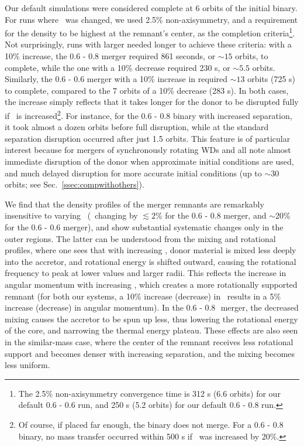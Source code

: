 Our default simulations were considered complete at 6 orbits of the initial binary.  For runs where \azero\ was changed, we used 2.5\% non-axisymmetry, and a requirement for the density to be highest at the remnant's center, as the completion criteria\footnote{The 2.5\% non-axisymmetry convergence time is 312 s (6.6 orbits) for our default 0.6 - 0.6 {\Msun} run, and 250 s (5.2 orbits) for our default 0.6 - 0.8 {\Msun} run.}.  Not surprisingly, runs with larger {\azero} needed longer to achieve these criteria: with a 10\% increase, the 0.6 - 0.8 {\Msun} merger required 861 seconds, or $\sim\!15$ orbits, to complete, while the one with a 10\% decrease required 230 s, or $\sim\!5.5$ orbits.  Similarly, the 0.6 - 0.6 {\Msun} merger with a 10\% increase in {\azero} required $\sim\!13$ orbits (725 s) to complete, compared to the 7 orbits of a 10\% decrease (283 s).  In both cases, the increase simply reflects that it takes longer for the donor to be disrupted fully if \azero\ is increased\footnote{Of course, if placed far enough, the binary does not merge.  For a 0.6 - 0.8 {\Msun} binary, no mass transfer occurred within 500 s if \azero\ was increased by 20\%.}.  For instance, for the 0.6 - 0.8 {\Msun} binary with increased separation, it took almost a dozen orbits before full disruption, while at the standard separation disruption occurred after just 1.5 orbits.  This feature is of particular interest because for mergers of synchronously rotating WDs \cite{dan+11,dan+12} and \cite{rask+12} all note almost immediate disruption of the donor when approximate initial conditions are used, and much delayed disruption for more accurate initial conditions (up to $\sim\!30$ orbits; see Sec.~\ref{ssec:compwithothers}).

We find that the density profiles of the merger remnants are remarkably insensitive to varying \azero\ (\rhoc\ changing by $\lesssim2$\% for the 0.6 - 0.8 {\Msun} merger, and $\sim20$\% for the 0.6 - 0.6 {\Msun} merger), and show substantial systematic changes only in the outer regions.  The latter can be understood from the mixing and rotational profiles, where one sees that with increasing \azero, donor material is mixed less deeply into the accretor, and rotational energy is shifted outward, causing the rotational frequency to peak at lower values and larger radii.  This reflects the increase in angular momentum with increasing \azero, which creates a more rotationally supported remnant (for both our systems, a 10\% increase (decrease) in \azero\ results in a 5\% increase (decrease) in angular momentum).  In the 0.6 - 0.8\,\Msun\ merger, the decreased mixing causes the accretor to be spun up less, thus lowering the rotational energy of the core, and narrowing the thermal energy plateau.  These effects are also seen in the similar-mass case, where the center of the remnant receives less rotational support and becomes denser with increasing separation, and the mixing becomes less uniform.

